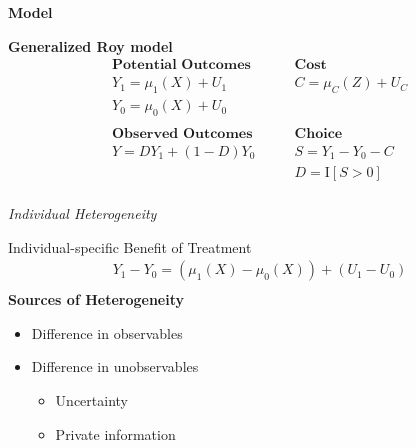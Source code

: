 \begin{frame}\begin{center}
	\LARGE\textbf{Model}
\end{center}\end{frame}
\begin{frame}
	\textbf{Generalized Roy model}
	\begin{align*}
	\textbf{Potential Outcomes} &\qquad \textbf{Cost} \\
	Y_1 = \mu_1(X) + U_1      &\qquad C = \mu_C(Z) + U_C \\
	Y_0 = \mu_0(X) + U_0      &\qquad \\
	& \\
	\textbf{Observed Outcomes} &\qquad \textbf{Choice} \\
	Y = D Y_1 + (1 - D)Y_0 &\qquad S = Y_1 - Y_0 - C \\
	&\qquad D = \mathrm{I}[S > 0] \\
	\end{align*}
\end{frame}
\begin{frame}\begin{center}
		\LARGE\textit{Individual Heterogeneity}
\end{center}\end{frame}
\begin{frame}
	Individual-specific Benefit of Treatment
	\begin{align*}
		Y_1 - Y_0 = (\mu_1(X) - \mu_0(X)) + (U_1 - U_0)\\
	\end{align*}
	\textbf{Sources of Heterogeneity}
	\begin{itemize}\setlength\itemsep{1em}
		\item Difference in observables
		\item Difference in unobservables\medskip
		\begin{itemize}\setlength\itemsep{1em}
			\item Uncertainty
			\item Private information
		\end{itemize}
	\end{itemize}
\end{frame}

